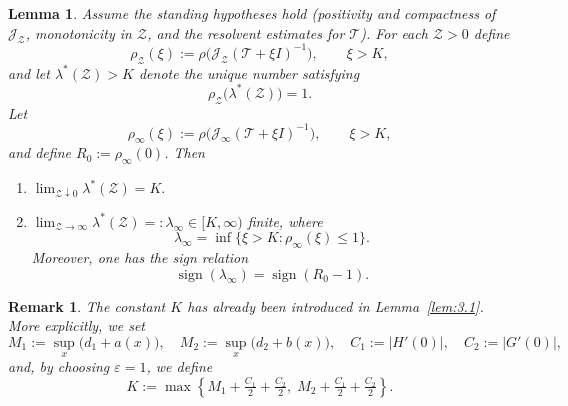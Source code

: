 \documentclass[a4paper,11pt]{amsart}
\newtheorem{lemma}[theorem]{Lemma}
\newtheorem{remark}{Remark}
\theoremstyle{definition}
\numberwithin{equation}{section}
\theoremstyle{definition}
\begin{document}
\begin{lemma}\label{lem:limit_lambdaZ}
Assume the standing hypotheses hold (positivity and compactness of $\mathscr J_{\mathcal Z}$, monotonicity in $\mathcal Z$, and the resolvent estimates for $\mathscr T$).
For each $\mathcal Z>0$ define
\[
\rho_{\mathcal Z}(\xi) := \rho\!\big(\mathscr J_{\mathcal Z}(\mathscr T+\xi I)^{-1}\big), \qquad \xi > K,
\]
and let $\lambda^\ast(\mathcal Z)>K$ denote the unique number satisfying
\[
\rho_{\mathcal Z}\big(\lambda^\ast(\mathcal Z)\big) = 1.
\]
Let
\[
\rho_\infty(\xi):=\rho\!\big(\mathscr J_\infty(\mathscr T+\xi I)^{-1}\big),\qquad \xi>K,
\]
and define $R_0:=\rho_\infty(0)$. Then

\begin{enumerate}
  \item \(\displaystyle \lim_{\mathcal Z\downarrow0}\lambda^\ast(\mathcal Z) = K.\)
  \item \(\displaystyle \lim_{\mathcal Z\to\infty}\lambda^\ast(\mathcal Z) =: \lambda_\infty \in [K,\infty)\) finite, where
  \[
  \lambda_\infty = \inf\{\xi>K : \rho_\infty(\xi)\le 1\}.
  \]
  Moreover, one has the sign relation
  \[
  \operatorname{sign}(\lambda_\infty) = \operatorname{sign}(R_0-1).
  \]
\end{enumerate}
\label{Samesign}
\end{lemma}
\begin{remark}
The constant $K$ has already been introduced in Lemma~\eqref{lem:3.1}.
More explicitly, we set
\[
M_1 := \sup_x \big(d_1+a(x)\big), \quad
M_2 := \sup_x \big(d_2+b(x)\big), \quad
C_1 := |H'(0)|, \quad
C_2 := |G'(0)|,
\]
and, by choosing $\varepsilon = 1$, we define
\[
K := \max\!\left\{ M_1 + \tfrac{C_1}{2} + \tfrac{C_2}{2}, \;
                  M_2 + \tfrac{C_1}{2} + \tfrac{C_2}{2} \right\}.
\]
\end{remark}
\end{document}
